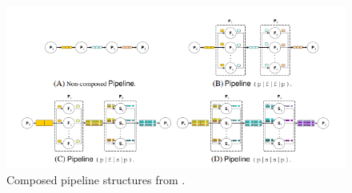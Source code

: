 \documentclass[12pt]{article}
\begin{document}
\begin{figure}[!ht]
	\centering 
	\includegraphics[width=\linewidth]{images/grppi}
	\caption{Composed pipeline structures from \cite{grppi}.}
	\label{fig:grppi}
\end{figure}
\end{document}
